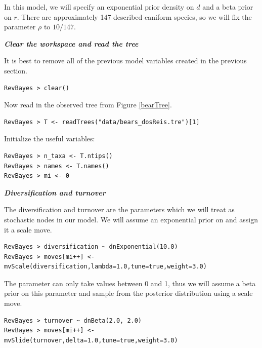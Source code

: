 In this model, we will specify an exponential prior density on $d$ and a beta prior on $r$.
There are approximately 147 described caniform species, so we will fix the parameter $\rho$ to $10/147$.



\textbf{\textit{Clear the workspace and read the tree}}

It is best to remove all of the previous model variables created in the previous section.
{\tt \begin{snugshade*}
\begin{lstlisting}
RevBayes > clear()
\end{lstlisting}
\end{snugshade*}}

Now read in the observed tree from Figure \ref{bearTree}. 
{\tt \begin{snugshade*}
\begin{lstlisting}
RevBayes > T <- readTrees("data/bears_dosReis.tre")[1]
\end{lstlisting}
\end{snugshade*}}

Initialize the useful variables:
{\tt \begin{snugshade*}
\begin{lstlisting}
RevBayes > n_taxa <- T.ntips()
RevBayes > names <- T.names()
RevBayes > mi <- 0 
\end{lstlisting}
\end{snugshade*}}

\textbf{\textit{Diversification and turnover}}

The diversification and turnover are the parameters which we will treat as stochastic nodes in our model. 
We will assume an exponential prior on  and assign it a scale move.
{\tt \begin{snugshade*}
\begin{lstlisting}
RevBayes > diversification ~ dnExponential(10.0) 
RevBayes > moves[mi++] <- mvScale(diversification,lambda=1.0,tune=true,weight=3.0) 
\end{lstlisting}
\end{snugshade*}}

The  parameter can only take values between 0 and 1, thus we will assume a beta prior on this parameter and sample from the posterior distribution using a scale move.
{\tt \begin{snugshade*}
\begin{lstlisting}
RevBayes > turnover ~ dnBeta(2.0, 2.0) 
RevBayes > moves[mi++] <- mvSlide(turnover,delta=1.0,tune=true,weight=3.0)
\end{lstlisting}
\end{snugshade*}}

